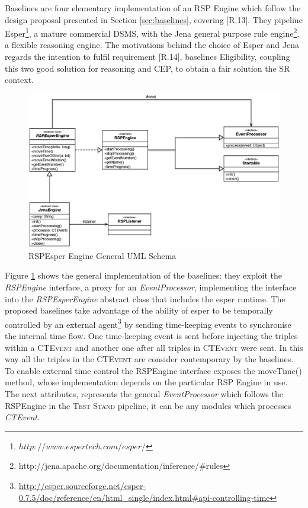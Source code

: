 \name Baselines are four elementary implementation of an RSP Engine which follow the design proposal presented in Section \ref{sec:baselines}, covering [R.13]. They pipeline Esper\footnote{$http://www.espertech.com/esper/$}, a mature commercial DSMS, with the Jena general purpose rule engine\footnote{http://jena.apache.org/documentation/inference/\#rules
}, a flexible reasoning engine. The motivations behind the choice of Esper and Jena regards the intention to fulfil requirement [R.14], baselines Eligibility, coupling this two good solution for reasoning and CEP, to obtain a fair solution the SR context. 

\begin{figure}[tbh]
  \centering
	\includegraphics[width=\linewidth]{images/uml_baselines_general}
	\caption{RSPEsper Engine General UML Schema} 
  	\label{fig:uml_baselines_general}
\end{figure}

Figure \ref{fig:uml_baselines_general} shows the general implementation of the baselines: they  exploit the \textit{RSPEngine} interface, a proxy for an \textit{EventProcessor}, implementing the interface into the \textit{RSPEsperEngine} abstract class that includes the esper runtime.  The proposed baselines take advantage of the ability of esper to be temporally controlled by an external agent\footnote{\url{http://esper.sourceforge.net/esper-0.7.5/doc/reference/en/html_single/index.html#api-controlling-time}} by sending time-keeping events to synchronise the internal time flow. One time-keeping event is sent before injecting the triples within a \textsc{CTEvent} and another one after all triples in \textsc{CTEvent} were sent. In this way all the triples in the \textsc{CTEvent} are consider contemporary by the baselines. To enable external time control the RSPEngine interface exposes the moveTime() method, whose implementation depends on the particular RSP Engine in use. The next attributes, represents the general \textit{EventProcessor} which follows the RSPEngine in the \textsc{Test Stand} pipeline, it can be any modules which processes \textit{CTEvent}.

